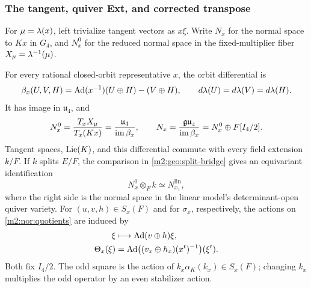 \subsubsection{The tangent, quiver Ext, and corrected transpose}

For $\mu=\lambda(x)$, left trivialize tangent vectors as $x\xi$.
Write $N_x$ for the normal space to $Kx$ in $G_4$, and $N_x^0$
for the reduced normal space in the fixed-multiplier fiber $X_\mu=\lambda^{-1}(\mu)$.

\begin{proposition}\label{m2:nor:full}
For every rational closed-orbit representative $x$, the orbit differential is
\begin{equation}\label{m2:nor:beta}
 \beta_x(U,V,H)=\operatorname{Ad}(x^{-1})(U\oplus H)-(V\oplus H),
 \qquad d\lambda(U)=d\lambda(V)=d\lambda(H).
\end{equation}
It has image in $\mathfrak u_4$, and
\begin{equation}\label{m2:nor:quotients}
 N_x^0=\frac{T_xX_\mu}{T_x(Kx)}
       =\frac{\mathfrak u_4}{\operatorname{im}\beta_x},\qquad
 N_x=\frac{\mathfrak{gu}_4}{\operatorname{im}\beta_x}
       =N_x^0\oplus F[I_4/2].
\end{equation}
Tangent spaces, $\operatorname{Lie}(K)$, and this differential commute with every
field extension $k/F$. If $k$ splits $E/F$, the comparison in
\cref{m2:geo:split-bridge} gives an equivariant identification
\begin{equation}\label{m2:nor:base-change}
 N_x^0\otimes_F k\simeq N^{\mathrm{lin}}_{x_1},
\end{equation}
where the right side is the normal space in the linear model's
determinant-open quiver variety. For $(u,v,h)\in S_x(F)$ and for
$\sigma_x$, respectively, the actions on \eqref{m2:nor:quotients} are induced by
\begin{align}
 \xi&\longmapsto\operatorname{Ad}(v\oplus h)\xi,\label{m2:nor:even}\\
 \Theta_x(\xi)&=
 \operatorname{Ad}\bigl((v_x\oplus h_x)(x^t)^{-1}\bigr)(\xi^t).
 \label{m2:nor:odd}
\end{align}
Both fix $I_4/2$. The odd square is the action of
$k_x\alpha_K(k_x)\in S_x(F)$; changing $k_x$ multiplies the
odd operator by an even stabilizer action.
\end{proposition}

